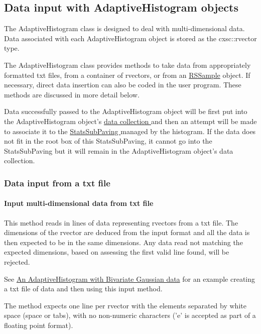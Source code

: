 \hypertarget{AdaptiveHistograms_adhsec_inputdata}{}\subsection{\-Data input with Adaptive\-Histogram objects}\label{AdaptiveHistograms_adhsec_inputdata}
\-The \-Adaptive\-Histogram class is designed to deal with multi-\/dimensional data. \-Data associated with each \-Adaptive\-Histogram object is stored as the cxsc\-::rvector type.

\-The \-Adaptive\-Histogram class provides methods to take data from appropriately formatted txt files, from a container of rvectors, or from an \hyperlink{classRSSample}{\-R\-S\-Sample} object. \-If necessary, direct data insertion can also be coded in the user program. \-These methods are discussed in more detail below.

\-Data successfully passed to the \-Adaptive\-Histogram object will be first put into the \-Adaptive\-Histogram object's \hyperlink{}{data collection } and then an attempt will be made to associate it to the \hyperlink{}{\-Stats\-Sub\-Paving } managed by the histogram. \-If the data does not fit in the root box of this \-Stats\-Sub\-Paving, it cannot go into the \-Stats\-Sub\-Paving but it will remain in the \-Adaptive\-Histogram object's data collection.\hypertarget{AdaptiveHistograms_adhsubsec_txtinput}{}\subsubsection{\-Data input from a txt file}\label{AdaptiveHistograms_adhsubsec_txtinput}
\hypertarget{AdaptiveHistograms_adhsubsubsec_inputrvectors}{}\paragraph{\-Input multi-\/dimensional data from txt file}\label{AdaptiveHistograms_adhsubsubsec_inputrvectors}
\-This method reads in lines of data representing rvectors from a txt file. \-The dimensions of the rvector are deduced from the input format and all the data is then expected to be in the same dimensions. \-Any data read not matching the expected dimensions, based on assessing the first valid line found, will be rejected.

\-See \hyperlink{AdaptiveHistograms_adhsubsec_exambivg}{\-An \-Adaptive\-Histogram with \-Bivariate \-Gaussian data} for an example creating a txt file of data and then using this input method.

\-The method expects one line per rvector with the elements separated by white space (space or tabs), with no non-\/numeric characters ('e' is accepted as part of a floating point format).

